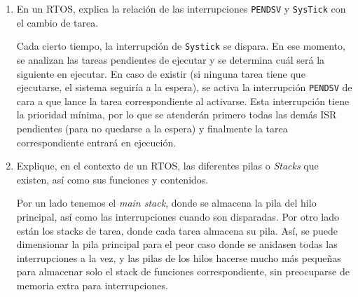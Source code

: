 \documentclass[svgnames,spanish,11pt,a4paper]{article}
\newcounter{solution}
\begin{document}
\begin{enumerate}
        \item En un RTOS, explica la relación de las interrupciones \texttt{PENDSV} y \texttt{SysTick} con el cambio de tarea.
        
            \begin{solution}
                Cada cierto tiempo, la interrupción de \texttt{Systick} se dispara. En ese momento, se analizan las tareas pendientes de ejecutar y se determina cuál será la siguiente en ejecutar. En caso de existir (si ninguna tarea tiene que ejecutarse, el sistema seguiría a la espera), se activa la interrupción \texttt{PENDSV} de cara a que lance la tarea correspondiente al activarse. Esta interrupción tiene la prioridad mínima, por lo que se atenderán primero todas las demás ISR pendientes (para no quedarse a la espera) y finalmente la tarea correspondiente entrará en ejecución.
            \end{solution}
        
        \item Explique, en el contexto de un RTOS, las diferentes pilas o \emph{Stacks} que existen, así como sus funciones y contenidos.
        
            \begin{solution}
                Por un lado tenemos el \emph{main stack}, donde se almacena la pila del hilo principal, así como las interrupciones cuando son disparadas. Por otro lado están los stacks de tarea, donde cada tarea almacena su pila. Así, se puede dimensionar la pila principal para el peor caso donde se anidasen todas las interrupciones a la vez, y las pilas de los hilos hacerse mucho más pequeñas para almacenar solo el stack de funciones correspondiente, sin preocuparse de memoria extra para interrupciones.
            \end{solution}
        


    \end{enumerate}


\end{document}
